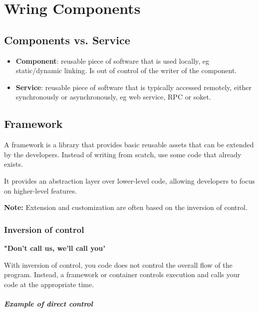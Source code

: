 \chapter{Wring Components}

\section{Components vs. Service}

\begin{itemize}
  \item \textbf{Component}: reusable piece of software that is used locally,
        eg static/dynamic linking. Is out of control of the writer of the component.
  \item \textbf{Service}: reusable piece of software that is typically accessed
        remotely, either synchronously or asynchronously, eg web service, RPC or soket.
\end{itemize}


\section{Framework}

A framework is a library that provides basic reusable
assets that can be extended by  the developers.
Instead of writing from scatch, use some code that
already exists.

It provides an abstraction layer over lower-level code, allowing developers
to focus on higher-level features.

\begin{tcolorbox}
  \textbf{Note:} Extension and customization are often based on the inversion
  of control.
\end{tcolorbox}

\subsection{Inversion of control}

\textbf{"Don't call us, we'll call you}"


With inversion of control, you code does not control the
overall flow of the program. Instead, a framework or container controls
execution and calls your code at the appropriate time.

\paragraph{Example of direct control}


